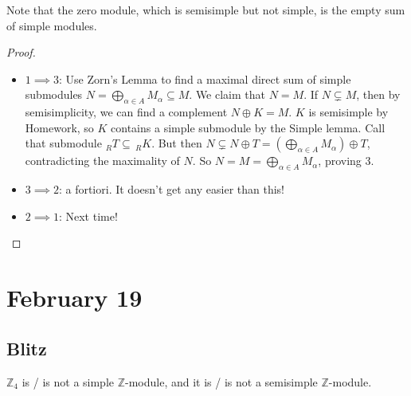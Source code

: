 \documentclass[12pt]{article}
\newcommand{\z}{\mathbb{Z}}
\theoremstyle{definition}
\begin{document}
Note that the zero module, which is semisimple but not simple, is the empty sum of simple modules.
\begin{proof}
    \noindent
    \begin{itemize}
        \item $1\implies3$: Use Zorn's Lemma to find a maximal direct sum of simple submodules $N=\bigoplus\limits_{\alpha\in A}M_{\alpha}\subseteq M$. We claim that $N=M$. If $N\subsetneq M$, then by semisimplicity, we can find a complement $N\oplus K=M$. $K$ is semisimple by Homework, so $K$ contains a simple submodule by the Simple lemma. Call that submodule $_RT\subseteq\,_RK$. But then $N\subsetneq N\oplus T=\left(\bigoplus\limits_{\alpha\in A}M_{\alpha}\right)\oplus T$, contradicting the maximality of $N$. So $N=M=\bigoplus\limits_{\alpha\in A}M_{\alpha}$, proving 3.
        \item $3\implies2$: a fortiori. It doesn't get any easier than this!
        \item $2\implies1$: Next time!
    \end{itemize}
\end{proof}
\section{February 19}
\subsection{Blitz}
$\z_4$ is / is not a simple $\z$-module, and it is / is not a semisimple $\z$-module.
\end{document}
